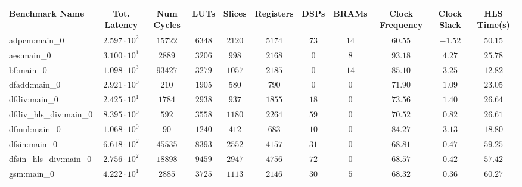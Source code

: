 \begin{tabular}{|l|c|c|c|c|c|c|c|c|c|c|}
\hline
Benchmark Name          & Tot. Latency           & Num Cycles & LUTs      & Slices    & Registers & DSPs    & BRAMs   & Clock Frequency & Clock Slack & HLS Time(s) \\
\hline
adpcm:main\_0           & $ 2.597 \cdot 10^{2} $ & $ 15722  $ & $ 6348  $ & $ 2120  $ & $ 5174  $ & $ 73  $ & $ 14  $ & $ 60.55       $ & $ -1.52   $ & $ 50.15   $ \\
aes:main\_0             & $ 3.100 \cdot 10^{1} $ & $ 2889   $ & $ 3206  $ & $ 998   $ & $ 2168  $ & $ 0   $ & $ 8   $ & $ 93.18       $ & $ 4.27    $ & $ 25.78   $ \\
bf:main\_0              & $ 1.098 \cdot 10^{3} $ & $ 93427  $ & $ 3279  $ & $ 1057  $ & $ 2185  $ & $ 0   $ & $ 14  $ & $ 85.10       $ & $ 3.25    $ & $ 12.82   $ \\
dfadd:main\_0           & $ 2.921 \cdot 10^{0} $ & $ 210    $ & $ 1905  $ & $ 580   $ & $ 790   $ & $ 0   $ & $ 0   $ & $ 71.90       $ & $ 1.09    $ & $ 23.05   $ \\
dfdiv:main\_0           & $ 2.425 \cdot 10^{1} $ & $ 1784   $ & $ 2938  $ & $ 937   $ & $ 1855  $ & $ 18  $ & $ 0   $ & $ 73.56       $ & $ 1.40    $ & $ 26.64   $ \\
dfdiv\_hls\_div:main\_0 & $ 8.395 \cdot 10^{0} $ & $ 592    $ & $ 3558  $ & $ 1180  $ & $ 2264  $ & $ 59  $ & $ 0   $ & $ 70.52       $ & $ 0.82    $ & $ 26.61   $ \\
dfmul:main\_0           & $ 1.068 \cdot 10^{0} $ & $ 90     $ & $ 1240  $ & $ 412   $ & $ 683   $ & $ 10  $ & $ 0   $ & $ 84.27       $ & $ 3.13    $ & $ 18.80   $ \\
dfsin:main\_0           & $ 6.618 \cdot 10^{2} $ & $ 45535  $ & $ 8393  $ & $ 2552  $ & $ 4157  $ & $ 31  $ & $ 0   $ & $ 68.81       $ & $ 0.47    $ & $ 59.25   $ \\
dfsin\_hls\_div:main\_0 & $ 2.756 \cdot 10^{2} $ & $ 18898  $ & $ 9459  $ & $ 2947  $ & $ 4756  $ & $ 72  $ & $ 0   $ & $ 68.57       $ & $ 0.42    $ & $ 57.42   $ \\
gsm:main\_0             & $ 4.222 \cdot 10^{1} $ & $ 2885   $ & $ 3725  $ & $ 1113  $ & $ 2146  $ & $ 30  $ & $ 5   $ & $ 68.32       $ & $ 0.36    $ & $ 60.27   $ \\

\end{tabular}

